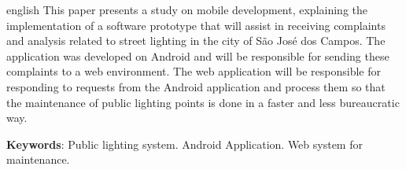 \documentclass[
	article,			%
	11pt,				%
	oneside,			%
	a4paper,			%
	english,			%
	brazil,				%
	sumario=tradicional
	]{abntex2}
\begin{document}
\postextual



\emptythanks
\maketitle
\renewcommand{\resumoname}{Abstract}
\begin{resumoumacoluna}
 \begin{otherlanguage*}{english}
   This paper presents a study on mobile development, explaining the
   implementation of a software prototype that will assist in receiving
   complaints and analysis related to street lighting in the city of São José
   dos Campos. The application was developed on Android and will be responsible
   for sending these complaints to a web environment. The web application
   will be responsible for responding to requests from the Android application
   and process them so that the maintenance of public lighting points is done
   in a faster and less bureaucratic way.
   \vspace{\onelineskip}

   \noindent
   \textbf{Keywords}: Public lighting system. Android Application. Web system for maintenance.
 \end{otherlanguage*}
\end{resumoumacoluna}



\end{document}

